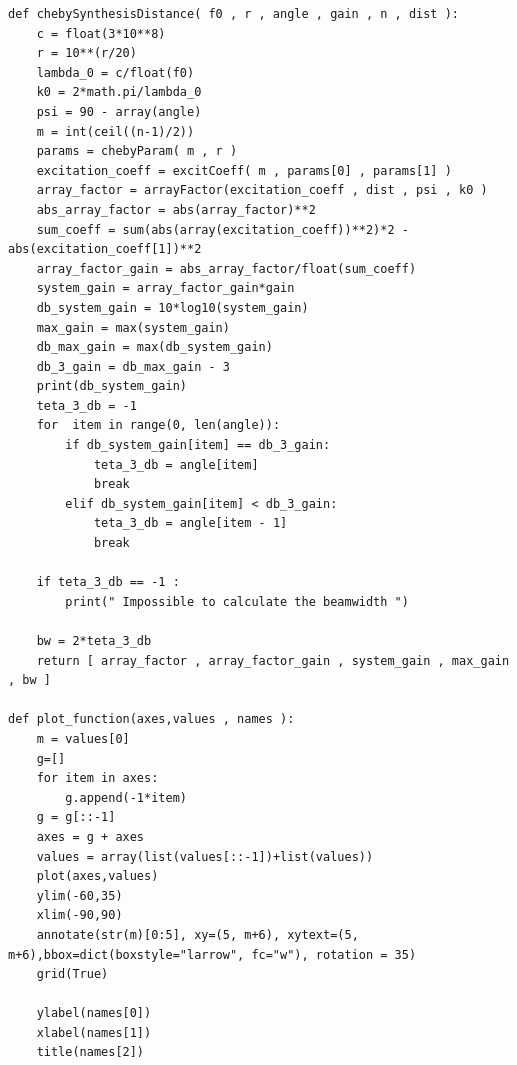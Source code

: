 \begin{verbatim}
def chebySynthesisDistance( f0 , r , angle , gain , n , dist ):
    c = float(3*10**8)
    r = 10**(r/20)
    lambda_0 = c/float(f0)
    k0 = 2*math.pi/lambda_0
    psi = 90 - array(angle)
    m = int(ceil((n-1)/2))
    params = chebyParam( m , r )
    excitation_coeff = excitCoeff( m , params[0] , params[1] )
    array_factor = arrayFactor(excitation_coeff , dist , psi , k0 )
    abs_array_factor = abs(array_factor)**2
    sum_coeff = sum(abs(array(excitation_coeff))**2)*2 - abs(excitation_coeff[1])**2
    array_factor_gain = abs_array_factor/float(sum_coeff)
    system_gain = array_factor_gain*gain
    db_system_gain = 10*log10(system_gain)
    max_gain = max(system_gain)
    db_max_gain = max(db_system_gain)
    db_3_gain = db_max_gain - 3
    print(db_system_gain)
    teta_3_db = -1
    for  item in range(0, len(angle)):
        if db_system_gain[item] == db_3_gain: 
            teta_3_db = angle[item]
            break
        elif db_system_gain[item] < db_3_gain:
            teta_3_db = angle[item - 1]                                                         
            break
        
    if teta_3_db == -1 :
        print(" Impossible to calculate the beamwidth ")

    bw = 2*teta_3_db
    return [ array_factor , array_factor_gain , system_gain , max_gain , bw ]

def plot_function(axes,values , names ):
    m = values[0]
    g=[]
    for item in axes:
        g.append(-1*item)
    g = g[::-1]
    axes = g + axes
    values = array(list(values[::-1])+list(values))
    plot(axes,values)
    ylim(-60,35)
    xlim(-90,90)
    annotate(str(m)[0:5], xy=(5, m+6), xytext=(5, m+6),bbox=dict(boxstyle="larrow", fc="w"), rotation = 35)
    grid(True)

    ylabel(names[0])
    xlabel(names[1])
    title(names[2])
\end{verbatim}

